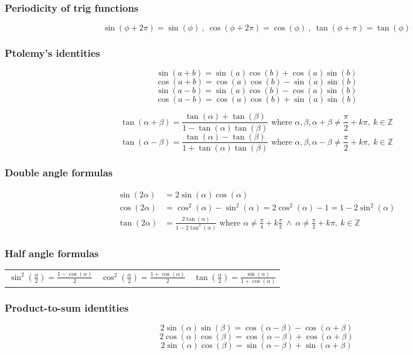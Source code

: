 \subsubsection{Periodicity of trig functions}
\[
\sin(\phi+2\pi)=\sin(\phi) \ , \ \cos(\phi+2\pi)=\cos(\phi) \ , \ \tan(\phi+\pi)=\tan(\phi)
\]


\subsubsection{Ptolemy's identities}
\[
\sin(a+b)=\sin(a)\cos(b)+\cos(a)\sin(b)
\]
\[
\cos(a+b)=\cos(a)\cos(b)-\sin(a)\sin(b)
\]
\[
\sin(a-b)=\sin(a)\cos(b)-\cos(a)\sin(b)
\]
\[
\cos(a-b)=\cos(a)\cos(b)+\sin(a)\sin(b)
\]

\[
\tan(\alpha+\beta)=\frac{\tan(\alpha) + \tan(\beta)}{1-\tan(\alpha)\tan(\beta)} \text{ where } \alpha, \beta, \alpha+\beta \ne \frac{\pi}{2} + k\pi, \ k \in \mathbb{Z}
\]
\[
\tan(\alpha-\beta)=\frac{\tan(\alpha) - \tan(\beta)}{1+\tan(\alpha)\tan(\beta)} \text{ where } \alpha, \beta, \alpha-\beta \ne \frac{\pi}{2} + k\pi, \ k \in \mathbb{Z}
\]

\subsubsection{Double angle formulas}
\begin{align*}
\sin(2\alpha) &= 2\sin(\alpha)\cos(\alpha) \\ 
\cos(2\alpha) &=\cos^2(\alpha)-\sin^2(\alpha) = 2\cos^2(\alpha)-1 = 1 - 2\sin^2(\alpha) \\
\tan(2\alpha) &= \frac{2\tan(\alpha)}{1-2\tan^2(\alpha)} \text{ where } \alpha \ne \frac{\pi}{4}+k\frac{\pi}{2} \ \wedge \ \alpha \ne \frac{\pi}{2}+k\pi, \ k \in \mathbb{Z}
\end{align*}


\subsubsection{Half angle formulas}
\begin{tabularx}{\textwidth}{ X X X }
$ \displaystyle \sin^2\left(\frac{\alpha}{2}\right) = \frac{1-\cos(\alpha)}{2} $ & 
$ \displaystyle \cos^2\left(\frac{\alpha}{2}\right) = \frac{1+\cos(\alpha)}{2} $ &
$  \displaystyle \tan\left(\frac{\alpha}{2}\right) = \frac{\sin(\alpha)}{1+\cos(\alpha)} $
\end{tabularx}


\subsubsection{Product-to-sum identities}
\[
2\sin(\alpha)\sin(\beta) = \cos(\alpha-\beta) - \cos(\alpha+\beta)
\]
\[
2\cos(\alpha)\cos(\beta) = \cos(\alpha-\beta) + \cos(\alpha+\beta)
\]
\[
2\sin(\alpha)\cos(\beta) = \sin(\alpha-\beta) + \sin(\alpha+\beta)
\]

